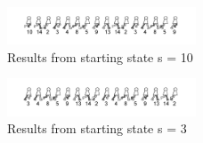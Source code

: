 \documentclass[conference]{IEEEtran}
\begin{document}
\begin{itemize}
\begin{figure}[h!]
  	\centering
    \includegraphics[width=0.5\textwidth]{img/3walkshow10.png}
    \caption{Results from starting state s = 10}
    \label{fig:3walkshow10}
\end{figure}

\begin{figure}[h!]
  	\centering
    \includegraphics[width=0.5\textwidth]{img/3walkshow3.png}
    \caption{Results from starting state s = 3}
    \label{fig:3walkshow3}
\end{figure}


\end{itemize}
\end{document}
